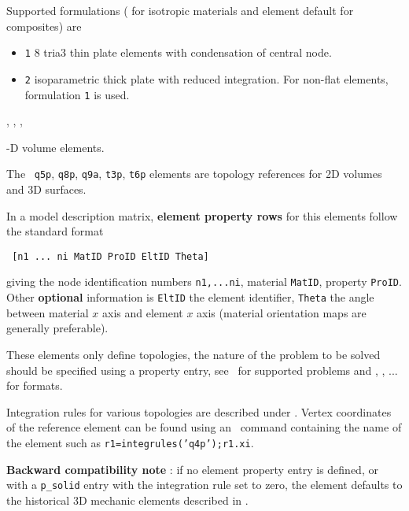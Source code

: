 

Supported formulations ( for isotropic materials and element default for composites) are 

\begin{itemize}
 \item {\tt 1} 8 tria3 thin plate elements with condensation of central node.
 \item {\tt 2} isoparametric thick plate with reduced integration. For non-flat elements, formulation {\tt 1} is used.
\end{itemize}



\melastic, \pshell, \femk, \feplot 


-D volume elements. 


The \qfourp\, {\tt q5p}, {\tt q8p}, {\tt q9a}, {\tt t3p}, {\tt t6p} elements are topology references for 2D volumes and 3D surfaces.


In a model description matrix, {\bf element property rows} for this  elements follow the standard format

\begin{verbatim}
 [n1 ... ni MatID ProID EltID Theta] 
\end{verbatim}


giving the node identification numbers {\tt n1,...ni}, material {\tt MatID}, property {\tt ProID}. Other {\bf optional} information is {\tt EltID} the element identifier, {\tt Theta} the angle between material $x$ axis and element $x$ axis (material orientation maps are generally preferable).


These elements only define topologies, the nature of the problem to be solved should be specified using a property entry, see~ for supported problems and  \psolid, \pheat, ... for formats. 


Integration rules for various topologies are described under \integrules. Vertex coordinates of the reference element can be found using an \integrules\ command containing the name of the element such as {\tt r1=integrules('q4p');r1.xi}.


{\bf Backward compatibility note} : if no element property entry is defined, or with a {\tt p\_solid} entry with the integration rule set to zero, the element defaults to the historical 3D mechanic elements described in . 



